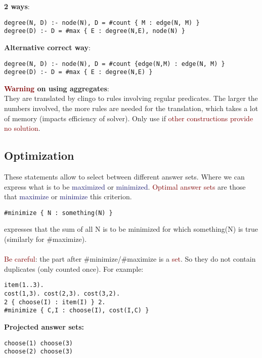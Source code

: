 \textbf{2 ways}: 
\begin{lstlisting}
degree(N, D) :- node(N), D = #count { M : edge(N, M) }
degree(D) :- D = #max { E : degree(N,E), node(N) }
\end{lstlisting}
\textbf{Alternative correct way}: 
\begin{lstlisting}
degree(N, D) :- node(N), D = #count {edge(N,M) : edge(N, M) }
degree(D) :- D = #max { E : degree(N,E) }
\end{lstlisting}

\vspace{0.35cm}

\textbf{\textcolor{Maroon}{Warning} on using aggregates}: \\
They are translated by clingo to rules involving regular predicates. The larger the numbers involved, the more rules are needed for the translation, which takes a lot of memory (impacts efficiency of solver). Only use if \textcolor{Maroon}{other constructions provide no solution}.

\subsection{Optimization}
These statements allow to select between different answer sets. Where we can express what is to be \textcolor{MidnightBlue}{maximized} or \textcolor{MidnightBlue}{minimized}. \textcolor{Maroon}{Optimal answer sets} are those that \textcolor{MidnightBlue}{maximize} or \textcolor{MidnightBlue}{minimize} this criterion.

\vspace{0.35cm}

\begin{lstlisting}
#minimize { N : something(N) }
\end{lstlisting}
expresses that the sum of all N is to be minimized for which something(N) is true (similarly for \#maximize).\\
\\
\textcolor{Maroon}{Be careful}: the part after \#minimize/\#maximize is a \textcolor{Maroon}{set}. So they do not contain duplicates (only counted once). For example:
\begin{lstlisting}
item(1..3).
cost(1,3). cost(2,3). cost(3,2).
2 { choose(I) : item(I) } 2.
#minimize { C,I : choose(I), cost(I,C) }
\end{lstlisting}

\vspace{0.25cm}

\textbf{Projected answer sets:}
\begin{lstlisting}
choose(1) choose(3)
choose(2) choose(3)
\end{lstlisting}

